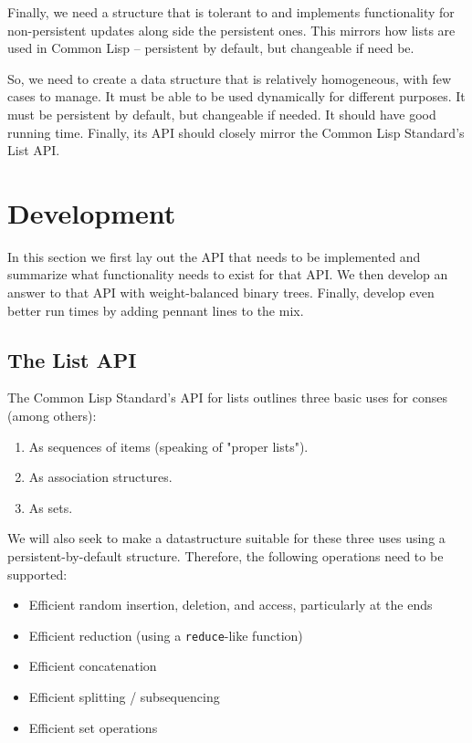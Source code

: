 \documentclass[sigconf]{acmart}
\begin{document}
Finally, we need a structure that is tolerant to and implements functionality
for non-persistent updates along side the persistent ones. This mirrors how
lists are used in Common Lisp -- persistent by default, but changeable if need
be.

So, we need to create a data structure that is relatively homogeneous, with
few cases to manage. It must be able to be used dynamically for different
purposes. It must be persistent by default, but changeable if needed. It should
have good running time. Finally, its API should closely mirror the Common Lisp
Standard's List API.

\section{Development}

In this section we first lay out the API that needs to be implemented and summarize
what functionality needs to exist for that API. We then develop an answer to
that API with weight-balanced binary trees. Finally, develop even better run
times by adding pennant lines to the mix.

\subsection{The List API}

The Common Lisp Standard's API for lists\cite{ANSI:1994:DPA} outlines three
basic uses for conses (among others):

\begin{enumerate}
    \item As sequences of items (speaking of "proper lists").
    \item As association structures.
    \item As sets.
\end{enumerate}

We will also seek to make a datastructure suitable for these three uses using a
persistent-by-default structure. Therefore, the following operations need to be
supported:

\begin{itemize}
    \item Efficient random insertion, deletion, and access, particularly at the
        ends
    \item Efficient reduction (using a \texttt{reduce}-like function)
    \item Efficient concatenation
    \item Efficient splitting / subsequencing
    \item Efficient set operations
\end{itemize}
\end{document}
